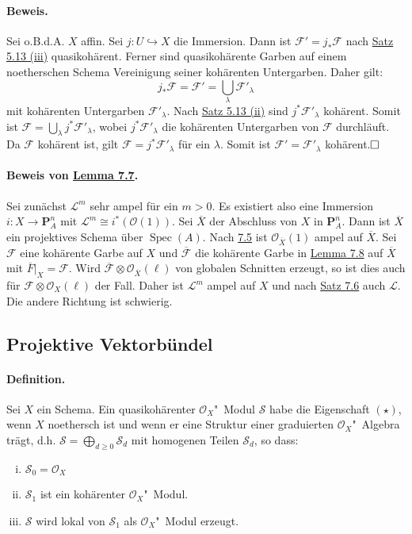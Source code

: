 \documentclass[11pt,b5paper,openany]{memoir}
\def \qed {$\hfill\square$}
\begin{document}
\paragraph{Beweis.} Sei o.B.d.A. $X$ affin. Sei $j:U\hookrightarrow X$ die Immersion. Dann ist $\mathcal{F}'=j_\ast\mathcal{F}$ nach \hyperref[5.13]{Satz 5.13 (iii)} quasikohärent. Ferner sind quasikohärente Garben auf einem noetherschen Schema Vereinigung seiner kohärenten Untergarben. Daher gilt:
\[j_\ast\mathcal{F} =\mathcal{F}' = \bigcup_\lambda\mathcal{F}'_\lambda \]
mit kohärenten Untergarben $\mathcal{F}'_\lambda$. Nach \hyperref[5.13]{Satz 5.13 (ii)} sind $j^\ast\mathcal{F}'_\lambda$ kohärent. Somit ist $\mathcal{F}=\bigcup_\lambda j^\ast\mathcal{F}'_\lambda$, wobei $j^\ast\mathcal{F}'_\lambda$ die kohärenten Untergarben von $\mathcal{F}$ durchläuft. Da $\mathcal{F}$ kohärent ist, gilt $\mathcal{F}=j^\ast\mathcal{F}'_\lambda$ für ein $\lambda$. Somit ist $\mathcal{F}'=\mathcal{F}'_\lambda$ kohärent.\qed

\paragraph{Beweis von \hyperref[7.7]{Lemma 7.7}.} Sei zunächst $\mathcal{L}^m$ sehr ampel für ein $m>0$. Es existiert also eine Immersion $i:X\to\mathbf{P}_A^n$ mit $\mathcal{L}^m\cong i^\ast(\mathcal{O}(1))$. Sei $\overline{X}$ der Abschluss von $X$ in $\mathbf{P}_A^n$. Dann ist $\overline{X}$ ein projektives Schema über $\operatorname{Spec}(A)$. Nach \hyperref[7.5]{7.5} ist $\mathcal{O}_{\overline{X}}(1)$ ampel auf $\overline{X}$. Sei $\mathcal{F}$ eine kohärente Garbe auf $X$ und $\overline{\mathcal{F}}$ die kohärente Garbe in \hyperref[7.8]{Lemma 7.8} auf $\overline{X}$ mit $\overline{F}|_X=\mathcal{F}$. Wird $\overline{\mathcal{F}}\otimes\mathcal{O}_{\overline{X}}(\ell)$ von globalen Schnitten erzeugt, so ist dies auch für $\mathcal{F}\otimes\mathcal{O}_X(\ell)$ der Fall. Daher ist $\mathcal{L}^m$ ampel auf $X$ und nach \hyperref[7.6]{Satz 7.6} auch $\mathcal{L}$. Die andere Richtung ist schwierig.

\subsection{Projektive Vektorbündel}

\paragraph{Definition.} Sei $X$ ein Schema. Ein quasikohärenter $\mathcal{O}_X$"~Modul $\mathcal{S}$ habe die Eigenschaft $(\star)$, wenn $X$ noethersch ist und wenn er eine Struktur einer graduierten $\mathcal{O}_X$"~Algebra trägt, d.h. $\mathcal{S}=\bigoplus_{d\geq 0}\mathcal{S}_d$ mit homogenen Teilen $\mathcal{S}_d$, so dass:
\begin{enumerate}[(i)]
\item $\mathcal{S}_0=\mathcal{O}_X$
\item $\mathcal{S}_1$ ist ein kohärenter $\mathcal{O}_X$"~Modul.
\item $\mathcal{S}$ wird lokal von $\mathcal{S}_1$ als $\mathcal{O}_X$"~Modul erzeugt.
\end{enumerate}
\end{document}
